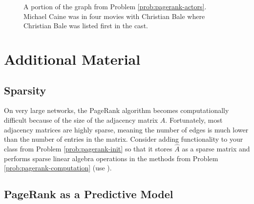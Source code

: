 \begin{figure}[H]
\centering
{}
\caption{A portion of the graph from Problem \ref{prob:pagerank-actors}.
Michael Caine was in four movies with Christian Bale where Christian Bale was listed first in the cast.}
\label{fig:pagerank-actor-network}
\end{figure}

\newpage

\section*{Additional Material} %

\subsection*{Sparsity} %

On very large networks, the PageRank algorithm becomes computationally difficult because of the size of the adjacency matrix $A$.
Fortunately, most adjacency matrices are highly sparse, meaning the number of edges is much lower than the number of entries in the matrix.
Consider adding functionality to your class from Problem \ref{prob:pagerank-init} so that it stores $\widehat{A}$ as a sparse matrix and performs sparse linear algebra operations in the methods from Problem \ref{prob:pagerank-computation} (use ).


\subsection*{PageRank as a Predictive Model} %

